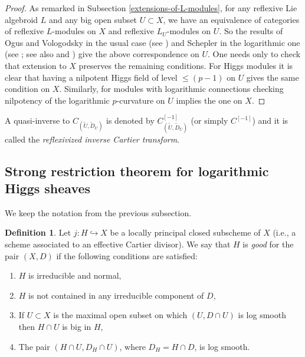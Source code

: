 \documentclass[12pt]{article}
\theoremstyle{plain}
\theoremstyle{definition}
\newtheorem{Definition}[Thm]{Definition}
\theoremstyle{remark}
\begin{document}
\begin{proof}
As remarked in Subsection \ref{extensions-of-L-modules}, for any reflexive Lie algebroid $L$ and any big open subset $U\subset X$, we have an equivalence of categories of reflexive $L$-modules on $X$  and reflexive $L_U$-modules on $U$.
So  the results of Ogus and Vologodsky in the usual case (see \cite{OV}) and Schepler in the logarithmic one (see \cite{Sc}; see also \cite[Theorem 2.5]{La3} and \cite[Appendix]{LSYZ}) 
give the above correspondence on $U$. One needs only to check that extension to $X$ preserves the remaining conditions. For Higgs modules it is clear that having a nilpotent Higgs field of level $\le (p-1)$ on $U$ gives the same condition on $X$. Similarly, for modules with logarithmic connections checking nilpotency of the logarithmic $p$-curvature on $U$ implies the one on $X$.
\end{proof}

\medskip


A quasi-inverse to  $C_{(\tilde U,\tilde D_U)}$ is denoted by $C_{(\tilde U,\tilde D_U)}^{[-1]} $  (or simply $C^{[-1]}$) and it is called the \emph{reflexivized inverse Cartier transform}. 


\subsection{Strong restriction theorem  for logarithmic Higgs sheaves}

We keep the notation from the previous subsection. 

\begin{Definition}
	Let  $j:H\hookrightarrow X$ be a locally principal closed subscheme of $X$ (i.e., a scheme associated to 
	an effective Cartier divisor). We say that $H$ is \emph{good} for the pair $(X, D)$ if the following conditions are satisfied:
	\begin{enumerate}
		\item $H$ is irreducible and normal, 
		\item  $H$ is not contained in any irreducible component of $D$,
		\item  If $U\subset X$ is the maximal open subset on which $(U, D\cap U)$ is log smooth then
		$H\cap U$ is big in $H$, 
		\item The pair $(H\cap U, D_H\cap U)$, where $D_H=H\cap D$, is log smooth.
	\end{enumerate}
\end{Definition}

\medskip
\end{document}
